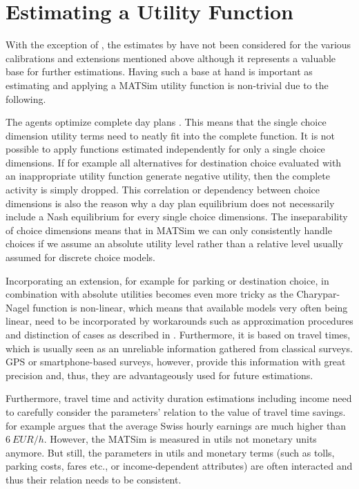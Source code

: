 \section{Estimating a Utility Function}
\label{sec:estimation}


With the exception of \citet[][]{BalmerEtAl_ResRep_datapuls_2010}, the estimates by \citet[][]{Kickhoefer_MastersThesis_2009} have not been considered for the various calibrations and extensions mentioned above although it represents a valuable base for further estimations. Having such a base at hand is important as estimating and applying a MATSim utility function is non-trivial due to the following. 

The agents optimize complete day plans \citep[see also][Section 6.3.1]{MATSim_Userguide_2014}. This means that the single choice dimension utility terms need to neatly fit into the complete function. It is not possible to apply functions estimated independently for only a single choice dimensions. If for example all alternatives for destination choice evaluated with an inappropriate utility function generate negative utility, then the complete activity is simply dropped. This correlation or dependency between choice dimensions is also the reason why a day plan equilibrium does not necessarily include a Nash equilibrium for every single choice dimensions. The inseparability of choice dimensions means that in MATSim we can only consistently handle choices if we assume an absolute utility level rather than a relative level usually assumed for discrete choice models. 

Incorporating an extension, for example for parking or destination choice, in combination with absolute utilities becomes even more tricky as the Charypar-Nagel function is non-linear, which means that available models very often being linear, need to be incorporated by workarounds such as approximation procedures and distinction of cases as described in \citet[][p.75ff]{Horni_PhDThesis_2013}. Furthermore, it is based on travel times, which is usually seen as an unreliable information gathered from classical surveys. GPS or smartphone-based surveys, however, provide this information with great precision and, thus, they are advantageously used for future estimations.

Furthermore, travel time and activity duration estimations including income need to carefully consider the parameters' relation to the value of travel time savings. \citet[][p.276]{MeisterEtAl_SVT_2009} for example argues that the average Swiss hourly earnings are much higher than $6\ EUR/h$. However, the MATSim is measured in utils not monetary units anymore. But still, the parameters in utils and monetary terms (such as tolls, parking costs, fares etc., or income-dependent attributes) are often interacted and thus their relation needs to be consistent.


